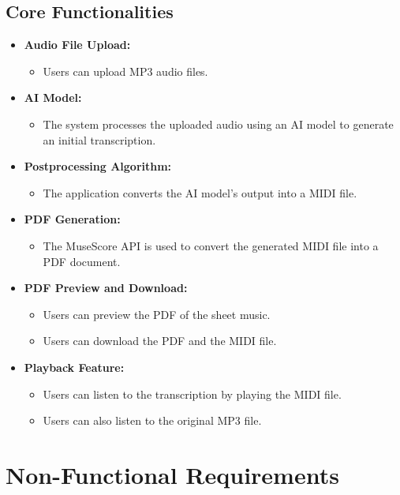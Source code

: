 \documentclass{article}
\begin{document}
\subsection{Core Functionalities}
\begin{itemize}
    \item \textbf{Audio File Upload:}
    \begin{itemize}
        \item Users can upload MP3 audio files.
    \end{itemize}
    \item \textbf{AI Model:}
    \begin{itemize}
        \item The system processes the uploaded audio using an AI model to generate an initial transcription.
    \end{itemize}
    \item \textbf{Postprocessing Algorithm:}
    \begin{itemize}
        \item The application converts the AI model's output into a MIDI file.
    \end{itemize}
    \item \textbf{PDF Generation:}
    \begin{itemize}
        \item The MuseScore API is used to convert the generated MIDI file into a PDF document.
    \end{itemize}
    \item \textbf{PDF Preview and Download:}
    \begin{itemize}
        \item Users can preview the PDF of the sheet music.
        \item Users can download the PDF and the MIDI file.
    \end{itemize}
    \item \textbf{Playback Feature:}
    \begin{itemize}
        \item Users can listen to the transcription by playing the MIDI file.
        \item Users can also listen to the original MP3 file.
    \end{itemize}
\end{itemize}

\FloatBarrier
\clearpage
\section{Non-Functional Requirements}
\end{document}
